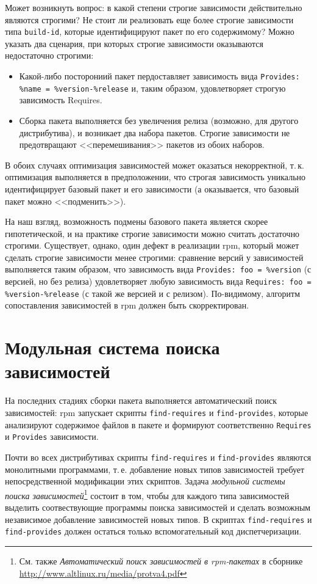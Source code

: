 \documentclass[russian,a4paper,12pt,titlepage]{article}
\begin{document}
Может возникнуть вопрос: в какой степени строгие зависимости действительно являются строгими?
Не стоит ли реализовать еще более строгие зависимости типа \verb|build-id|, которые идентифицируют пакет по его содержимому?
Можно указать два сценария, при которых строгие зависимости оказываются недостаточно строгими:
\begin{itemize}
\item Какой-либо посторониий пакет пердоставляет зависимость вида \verb|Provides: %name = %version-%release| и,
таким образом, удовлетворяет строгую зависимость Requires.
\item Сборка пакета выполняется без увеличения релиза (возможно, для другого дистрибутива), и возникает два набора пакетов.
Строгие зависимости не предотвращают <<перемешивания>> пакетов из обоих наборов.
\end{itemize}
В обоих случаях оптимизация зависимостей может оказаться некорректной, т.\,к. оптимизация выполняется в предположении,
что строгая зависимость уникально идентифицирует базовый пакет и его зависимости (а оказывается, что базовый пакет можно <<подменить>>).

На наш взгляд, возможность подмены базового пакета является скорее гипотетической, и на практике строгие зависимости
можно считать достаточно строгими.  Существует, однако, один дефект в реализации rpm, который может сделать строгие
зависимости менее строгими: сравнение версий у зависимостей выполняется таким образом, что зависимость вида
\verb|Provides: foo = %version| (с версией, но без релиза) удовлетворяет любую зависимость вида
\verb|Requires: foo = %version-%release| (с такой же версией и с релизом).
По-видимому, алгоритм сопоставления зависимостей в rpm должен быть скорректирован.

\section{Модульная система поиска зависимостей}
На последних стадиях сборки пакета выполняется автоматический поиск зависимостей:
rpm запускает скрипты \verb|find-requires| и \verb|find-provides|, которые анализируют
содержимое файлов в пакете и формируют соответственно \verb|Requires| и \verb|Provides| зависимости.

Почти во всех дистрибутивах скрипты \verb|find-requires| и \verb|find-provides| являются
монолитными программами, т.\,е. добавление новых типов зависимостей требует непосредственной модификации
этих скриптов.  Задача \textit{модульной системы поиска зависимостей}\footnote{См. также
\textit{Автоматический поиск зависимостей в rpm-пакетах} в сборнике
\url{http://www.altlinux.ru/media/protva4.pdf}}
состоит в том, чтобы для каждого типа зависимостей выделить соотвествующие программы поиска зависимостей
и сделать возможным независимое добавление зависимостей новых типов.  В скриптах \verb|find-requires| и \verb|find-provides|
должен остаться только вспомогательный код диспетчеризации.
\end{document}

